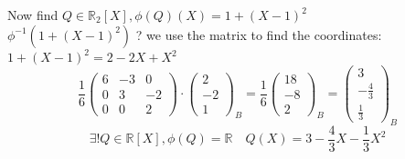 \documentclass[notitlepage]{math}
\begin{document}
Now find $Q \in \mathbb{R}_2[X], \phi(Q)(X) = 1 + (X-1)^2$ \\
$\phi^{-1}(1 + (X-1)^2)$ ? we use the matrix to find the coordinates: $1+ (X-1)^2 = 2 -2X +X^2$ \\
\[\frac{1}{6} \begin{pmatrix} 6 & -3 & 0 \\ 0 & 3 & -2 \\ 0 & 0 & 2 \end{pmatrix} \cdot \begin{pmatrix} 2 \\ -2 \\ 1 \end{pmatrix}_B = \frac{1}{6} \begin{pmatrix} 18 \\ -8 \\ 2 \end{pmatrix}_B = \begin{pmatrix} 3 \\ -\frac{4}{3} \\ \frac{1}{3} \end{pmatrix}_B\]
\[ \exists ! Q \in \mathbb{R}[X], \phi(Q) = \mathbb{R} \quad Q(X) = 3 - \frac{4}{3}X - \frac{1}{3}X^2\]
\end{document}

